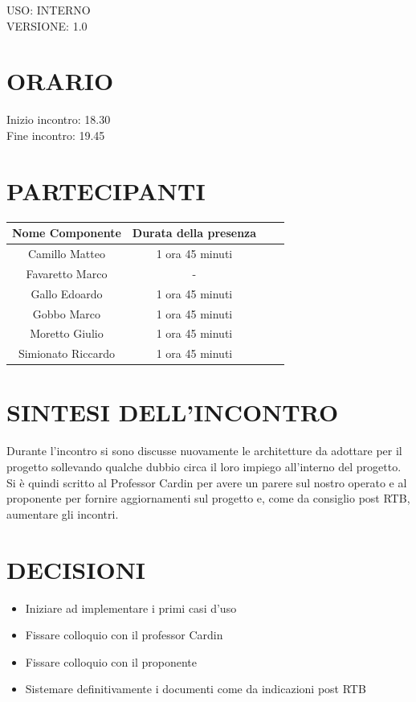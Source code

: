 \documentclass[5pt]{article}
\begin{document}
\begin{flushright}
    \begin{spacing}{1}
        USO: INTERNO\\
        VERSIONE: 1.0\\
    \end{spacing}
\end{flushright}


\restoregeometry

\pagebreak



\section{\Large ORARIO}
\begin{spacing}{1.5}
    {\large Inizio incontro: 18.30}\\
    {\large Fine incontro: 19.45}
\end{spacing}

\section{PARTECIPANTI}
\setlength\cellspacetoplimit{6pt}
\setlength\cellspacebottomlimit{6pt}

\begin{table}[ht]
  \begin{tabular}{|Sc|Sc|}
    \hline
    \textbf{Nome Componente} & \textbf{Durata della presenza} \\
    \hline
    Camillo Matteo & 1 ora 45 minuti \\
    Favaretto Marco & - \\
    Gallo Edoardo & 1 ora 45 minuti \\
    Gobbo Marco & 1 ora 45 minuti \\
    Moretto Giulio & 1 ora 45 minuti \\
    Simionato Riccardo & 1 ora 45 minuti \\
    \hline
  \end{tabular}
  \label{tab:conference}
\end{table}

\section{SINTESI DELL'INCONTRO}
Durante l'incontro si sono discusse nuovamente le architetture da adottare per il progetto sollevando qualche dubbio circa il loro impiego all'interno del progetto. \\
Si è quindi scritto al Professor Cardin per avere un parere sul nostro operato e al proponente per fornire aggiornamenti sul progetto e, come da consiglio post RTB, aumentare gli incontri.
\section{DECISIONI}
\begin{itemize}
    \item Iniziare ad implementare i primi casi d'uso
    \item Fissare colloquio con il professor Cardin
    \item Fissare colloquio con il proponente
    \item Sistemare definitivamente i documenti come da indicazioni post RTB
\end{itemize}
\end{document}

